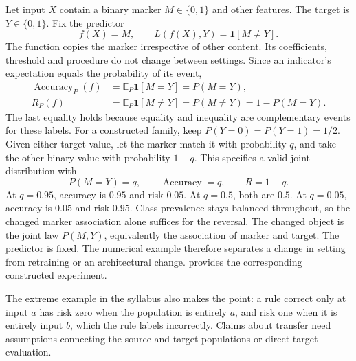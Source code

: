 Let input $X$ contain a binary marker $M\in\{0,1\}$ and other features. The target is $Y\in\{0,1\}$. Fix the predictor
\[
f(X)=M,\qquad L(f(X),Y)=\mathbf1[M\ne Y].
\]
The function copies the marker irrespective of other content. Its coefficients, threshold and procedure do not change between settings.
Since an indicator's expectation equals the probability of its event,
\[
\begin{aligned}
\operatorname{Accuracy}_P(f)
&=\mathbb E_P\mathbf1[M=Y]=P(M=Y),\\
R_P(f)&=\mathbb E_P\mathbf1[M\ne Y]=P(M\ne Y)=1-P(M=Y).
\end{aligned}
\]
The last equality holds because equality and inequality are complementary events for these labels.
For a constructed family, keep $P(Y=0)=P(Y=1)=1/2$. Given either target value, let the marker match it with probability $q$, and take the other binary value with probability $1-q$. This specifies a valid joint distribution with
\[
P(M=Y)=q,\qquad \operatorname{Accuracy}=q,\qquad R=1-q.
\]
At $q=0.95$, accuracy is $0.95$ and risk $0.05$. At $q=0.5$, both are $0.5$. At $q=0.05$, accuracy is $0.05$ and risk $0.95$. Class prevalence stays balanced throughout, so the changed marker association alone suffices for the reversal.
The changed object is the joint law $P(M,Y)$, equivalently the association of marker and target. The predictor is fixed. The numerical example therefore separates a change in setting from retraining or an architectural change.  provides the corresponding constructed experiment.

The extreme example in the syllabus also makes the point: a rule correct only at input $a$ has risk zero when the population is entirely $a$, and risk one when it is entirely input $b$, which the rule labels incorrectly. Claims about transfer need assumptions connecting the source and target populations or direct target evaluation.

